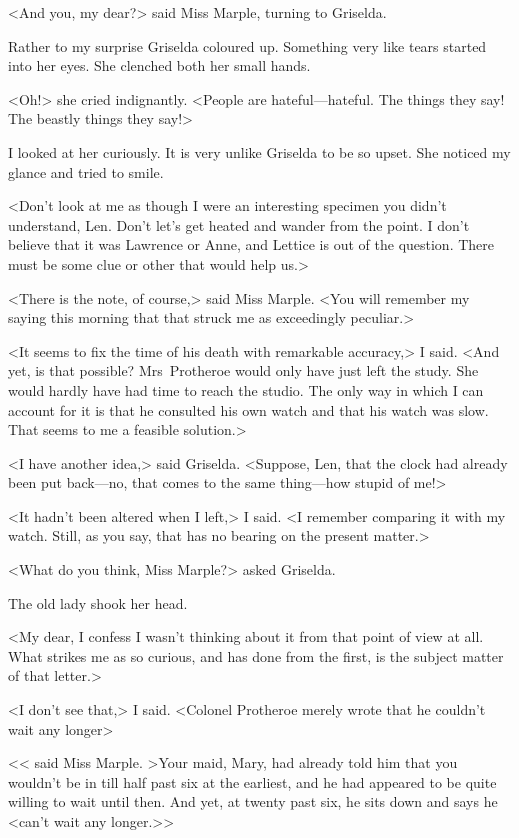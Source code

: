 <And you, my dear?> said Miss Marple, turning to Griselda.

Rather to my surprise Griselda coloured up. Something very like tears started into her eyes. She clenched both her small hands.

<Oh!> she cried indignantly. <People are hateful—hateful. The things they say! The beastly things they say!>

I looked at her curiously. It is very unlike Griselda to be so upset. She noticed my glance and tried to smile.

<Don't look at me as though I were an interesting specimen you didn't understand, Len. Don't let's get heated and wander from the point. I don't believe that it was Lawrence or Anne, and Lettice is out of the question. There must be some clue or other that would help us.>

<There is the note, of course,> said Miss Marple. <You will remember my saying this morning that that struck me as exceedingly peculiar.>

<It seems to fix the time of his death with remarkable accuracy,> I said. <And yet, is that possible? Mrs~Protheroe would only have just left the study. She would hardly have had time to reach the studio. The only way in which I can account for it is that he consulted his own watch and that his watch was slow. That seems to me a feasible solution.>

<I have another idea,> said Griselda. <Suppose, Len, that the clock had already been put back—no, that comes to the same thing—how stupid of me!>

<It hadn't been altered when I left,> I said. <I remember comparing it with my watch. Still, as you say, that has no bearing on the present matter.>

<What do you think, Miss Marple?> asked Griselda.

The old lady shook her head.

<My dear, I confess I wasn't thinking about it from that point of view at all. What strikes me as so curious, and has done from the first, is the subject matter of that letter.>

<I don't see that,> I said. <Colonel Protheroe merely wrote that he couldn't wait any longer\longdash>

<< said Miss Marple. >Your maid, Mary, had already told him that you wouldn't be in till half past six at the earliest, and he had appeared to be quite willing to wait until then. And yet, at twenty past six, he sits down and says he <can't wait any longer.>>

